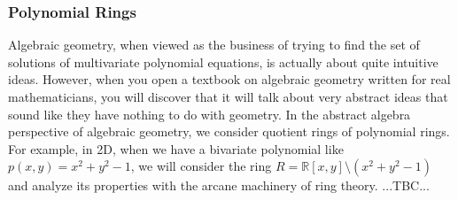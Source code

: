 \subsubsection{Polynomial Rings}
Algebraic geometry, when viewed as the business of trying to find the set of solutions of multivariate polynomial equations, is actually about quite intuitive ideas. However, when you open a textbook on algebraic geometry written for real mathematicians, you will discover that it will talk about very abstract ideas that sound like they have nothing to do with geometry. In the abstract algebra perspective of algebraic geometry, we consider quotient rings of polynomial rings. For example, in 2D, when we have a bivariate polynomial like $p(x,y) = x^2 + y^2 - 1$, we will consider the ring $R = \mathbb{R}[x,y] \setminus (x^2 + y^2 - 1)$ and analyze its properties with the arcane machinery of ring theory. ...TBC...


%
%

%



